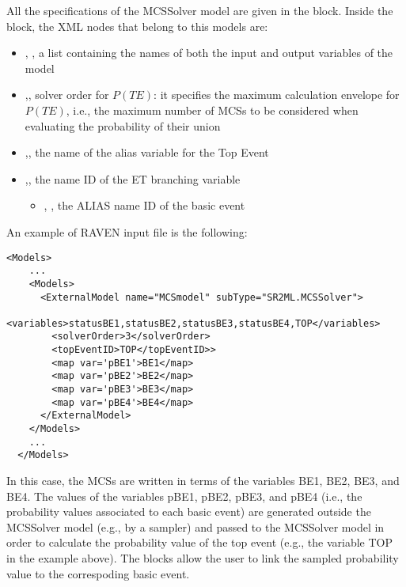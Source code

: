 All the specifications of the MCSSolver model are given in the  block. 
Inside the  block, the XML nodes that belong to this models are:
\begin{itemize}
  \item  {}, , a list containing the names of both the input and output variables of the model
  \item  {},, solver order for $P(TE)$: it specifies the maximum calculation envelope 
                                                                      for $P(TE)$, i.e., the maximum number of MCSs to be considered when evaluating the 
                                                                      probability of their union
  \item  {},, the name of the alias variable for the Top Event
  \item  {},, the name ID of the ET branching variable
	  \begin{itemize}
	    \item {}, , the ALIAS name ID of the basic event
	  \end{itemize}
\end{itemize}

An example of RAVEN input file is the following:

\begin{lstlisting}[style=XML,morekeywords={anAttribute},caption=MCSSolver model input example., label=lst:MCSSolver_InputExample]
  <Models> 
    ...
    <Models>
      <ExternalModel name="MCSmodel" subType="SR2ML.MCSSolver">
        <variables>statusBE1,statusBE2,statusBE3,statusBE4,TOP</variables>
        <solverOrder>3</solverOrder>
        <topEventID>TOP</topEventID>>
        <map var='pBE1'>BE1</map>
        <map var='pBE2'>BE2</map>
        <map var='pBE3'>BE3</map>
        <map var='pBE4'>BE4</map>
      </ExternalModel>
    </Models>
    ...
  </Models>
\end{lstlisting}

In this case, the MCSs are written in terms of the variables BE1, BE2, BE3, and BE4.
The values of the variables pBE1, pBE2, pBE3, and pBE4 (i.e., the probability values associated to each basic event) are 
generated outside the MCSSolver model (e.g., by a sampler) and passed to the MCSSolver model in order to calculate the 
probability value of the top event (e.g., the variable TOP in the example above).
The  blocks allow the user to link the sampled probability value to the correspoding basic event.

